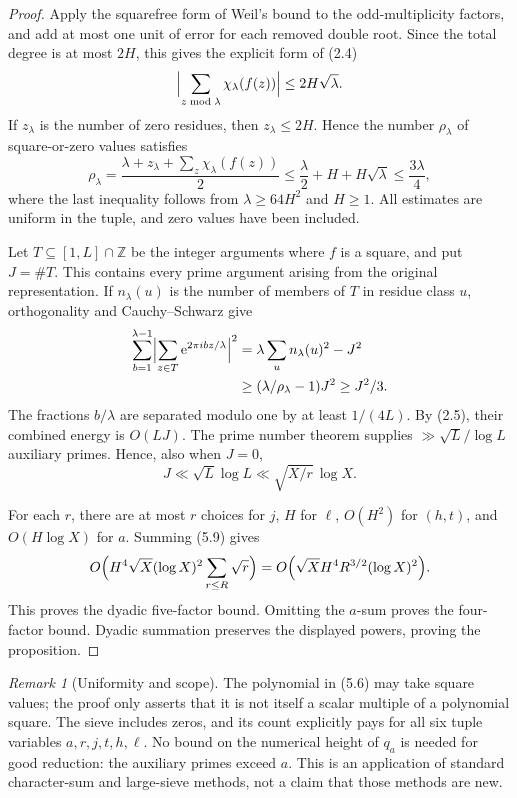 \documentclass[letterpaper]{article}
\theoremstyle{definition}
\theoremstyle{remark}
\newtheorem{remark}[theorem]{Remark}
\numberwithin{equation}{section}
\begin{document}
\begin{proof}
Apply the squarefree form of Weil's bound to the odd-multiplicity factors, and add at most
one unit of error for each removed double root. Since the total degree is at most $2H$, this gives
the explicit form of (2.4)
\[
  \Bigl|\sum_{z\bmod\lambda}\chi_\lambda(f(z))\Bigr|\le 2H\sqrt\lambda.
\]
If $z_\lambda$ is the number of zero residues, then $z_\lambda\le 2H$. Hence the number $\rho_\lambda$ of square-or-zero
values satisfies
\[
  \rho_\lambda=\frac{\lambda+z_\lambda+\sum_z\chi_\lambda(f(z))}{2}\le\frac\lambda2+H+H\sqrt\lambda\le\frac{3\lambda}{4},
\]
where the last inequality follows from $\lambda\ge 64H^2$ and $H\ge 1$. All estimates are uniform in the
tuple, and zero values have been included.

Let $T\subseteq[1,L]\cap\mathbb Z$ be the integer arguments where $f$ is a square, and put $J=\#T$. This
contains every prime argument arising from the original representation. If $n_\lambda(u)$ is the number
of members of $T$ in residue class $u$, orthogonality and Cauchy--Schwarz give
\begin{align*}
  \sum_{b=1}^{\lambda-1}\Bigl|\sum_{z\in T}\mathrm e^{2\pi ibz/\lambda}\Bigr|^2
  &=\lambda\sum_u n_\lambda(u)^2-J^2\\
  &\ge(\lambda/\rho_\lambda-1)J^2\ge J^2/3.
\end{align*}
The fractions $b/\lambda$ are separated modulo one by at least $1/(4L)$. By (2.5), their combined energy
is $O(LJ)$. The prime number theorem supplies $\gg\sqrt L/\log L$ auxiliary primes. Hence, also when
$J=0$,
\begin{equation}
  J\ll\sqrt L\log L\ll\sqrt{X/r}\,\log X.
\end{equation}

For each $r$, there are at most $r$ choices for $j$, $H$ for $\ell$, $O(H^2)$ for $(h,t)$, and $O(H\log X)$ for
$a$. Summing (5.9) gives
\[
  O\Bigl(H^4\sqrt X(\log X)^2\sum_{r\le R}\sqrt r\Bigr)=O\Bigl(\sqrt XH^4R^{3/2}(\log X)^2\Bigr).
\]
This proves the dyadic five-factor bound. Omitting the $a$-sum proves the four-factor bound.
Dyadic summation preserves the displayed powers, proving the proposition.
\end{proof}

\begin{remark}[Uniformity and scope]
The polynomial in (5.6) may take square values; the proof
only asserts that it is not itself a scalar multiple of a polynomial square. The sieve includes zeros,
and its count explicitly pays for all six tuple variables $a,r,j,t,h,\ell$. No bound on the numerical
height of $q_a$ is needed for good reduction: the auxiliary primes exceed $a$. This is an application
of standard character-sum and large-sieve methods, not a claim that those methods are new.
\end{remark}
\end{document}
